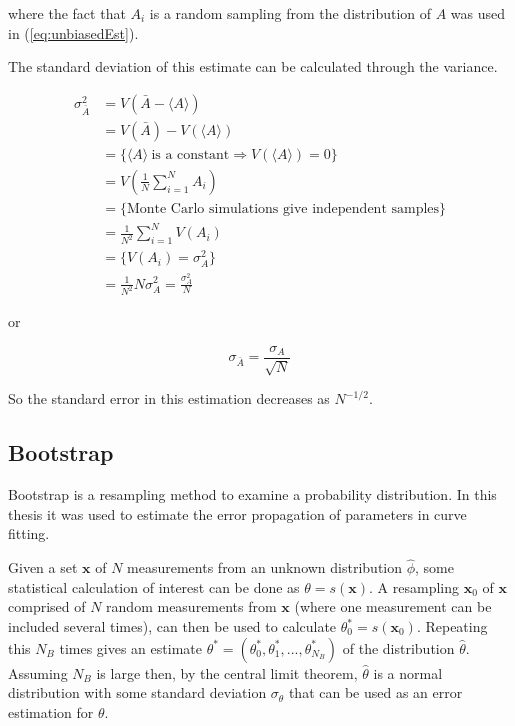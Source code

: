 where the fact that $A_i$ is a random sampling from the distribution of $A$ was used in (\ref{eq:unbiasedEst}).

The standard deviation of this estimate can be calculated through the variance.

\begin{align}
    \sigma_{\bar A}^{2} &= V\left( \bar A - \langle A \rangle \right ) \\
%
    &= V\left(\bar A\right) - V\left(\langle A \rangle\right) \\
%
    &= \{ \langle A \rangle \ \text{is a constant} \Rightarrow V(\langle A \rangle) = 0 \} \\
%
    &= V \left ( \frac{1}{N} \sum_{i = 1}^{N} A_i \right ) \\
%
    &= \{ \text{Monte Carlo simulations give independent samples} \} \\
%
    &= \frac{1}{N^2} \sum_{i = 1}^{N} V(A_i) \\
%
    &= \{ V(A_i) = \sigma_{A}^2 \} \\
%
    &= \frac{1}{N^2} N \sigma_{A}^2 = \frac{\sigma_{A}^2}{N}
\end{align}

or

\begin{equation}
    \sigma_{\bar A} = \frac{\sigma_A}{\sqrt{N}}
\end{equation}

So the standard error in this estimation decreases as $N^{-1/2}$.

\subsection{Bootstrap}
\label{subsec:Bootstrap}

Bootstrap is a resampling method to examine a probability distribution. In this thesis it was used to estimate the error propagation of parameters in curve fitting.

Given a set $\bm x$ of $N$ measurements from an unknown distribution $\hat \phi$, some statistical calculation of interest can be done as $\theta = s(\bm x)$. A resampling $\bm x_0$ of $\bm x$ comprised of $N$ random measurements from $\bm x$ (where one measurement can be included several times), can then be used to calculate $\theta^*_0 = s(\bm x_0)$. Repeating this $N_B$ times gives an estimate $\theta^* = (\theta^*_0, \theta^*_1, ..., \theta^*_{N_B})$ of the distribution $\hat \theta$. Assuming $N_B$ is large then, by the central limit theorem, $\hat \theta$ is a normal distribution with some standard deviation $\sigma_\theta$ that can be used as an error estimation for $\theta$.

